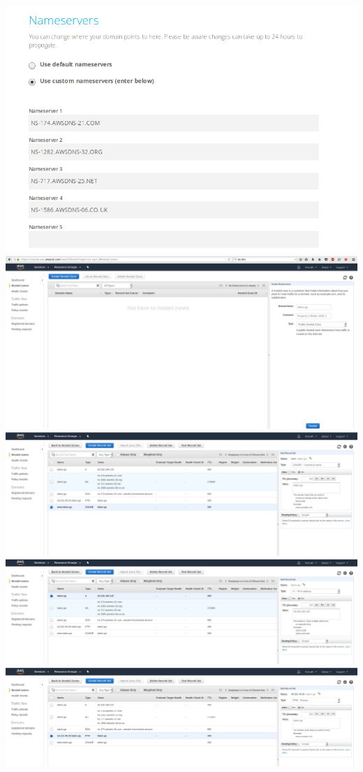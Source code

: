 \documentclass[9pt]{article}
\begin{document}
\includegraphics[width=\textwidth]{nameservers}
\includegraphics[width=\textwidth]{DNS_management}
\includegraphics[width=\textwidth]{CNAME}
\includegraphics[width=\textwidth]{A}
\includegraphics[width=\textwidth]{PTR}
\end{document}
